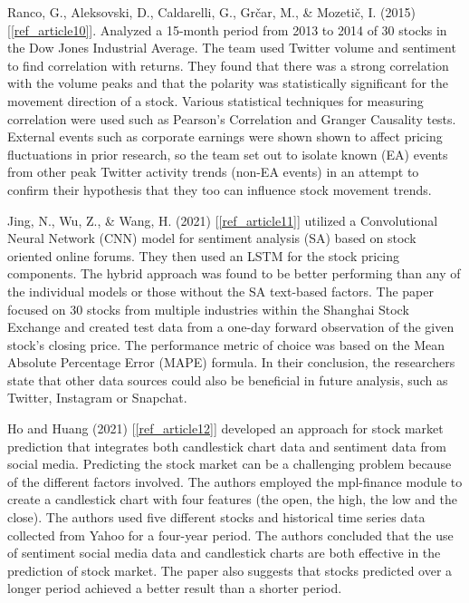\documentclass{llncs}
\begin{document}
Ranco, G., Aleksovski, D., Caldarelli, G., Grčar, M., \& Mozetič, I. (2015) [\ref{ref_article10}].  Analyzed a 15-month period from 2013 to 2014 of 30 stocks in the Dow Jones Industrial Average.  The team used Twitter volume and sentiment to find correlation with returns.  They found that there was a strong correlation with the volume peaks and that the polarity was statistically significant for the movement direction of a stock.  Various statistical techniques for measuring correlation were used such as Pearson's Correlation and Granger Causality tests.  External events such as corporate earnings were shown shown to affect pricing fluctuations in prior research, so the team set out to isolate known (EA) events from other peak Twitter activity trends (non-EA events) in an attempt to confirm their hypothesis that they too can influence stock movement trends.

Jing, N., Wu, Z., \& Wang, H. (2021) [\ref{ref_article11}]  utilized a Convolutional Neural Network (CNN) model for sentiment analysis (SA) based on stock oriented online forums.  They then used an LSTM for the stock pricing components.  The hybrid approach was found to be better performing than any of the individual models or those without the SA text-based factors.  The paper focused on 30 stocks from multiple industries within the Shanghai Stock Exchange and created test data from a one-day forward observation of the given stock's closing price.  The performance  metric of choice was based on the Mean Absolute Percentage Error (MAPE) formula.  In their conclusion, the researchers state that other data sources could also be beneficial in future analysis, such as Twitter, Instagram or Snapchat. 

Ho and Huang (2021) [\ref{ref_article12}] developed an approach for stock market prediction that integrates both candlestick chart data and sentiment data from social media. Predicting the stock market can be a challenging problem because of the different factors involved. The authors employed the mpl-finance module to create a candlestick chart with four features (the open, the high, the low and the close). The authors used five different stocks and historical time series data collected from Yahoo for a four-year period. The authors concluded that the use of sentiment social media data and candlestick charts are both effective in the prediction of stock market. The paper also suggests that stocks predicted over a longer period achieved a better result than a shorter period.
\end{document}
